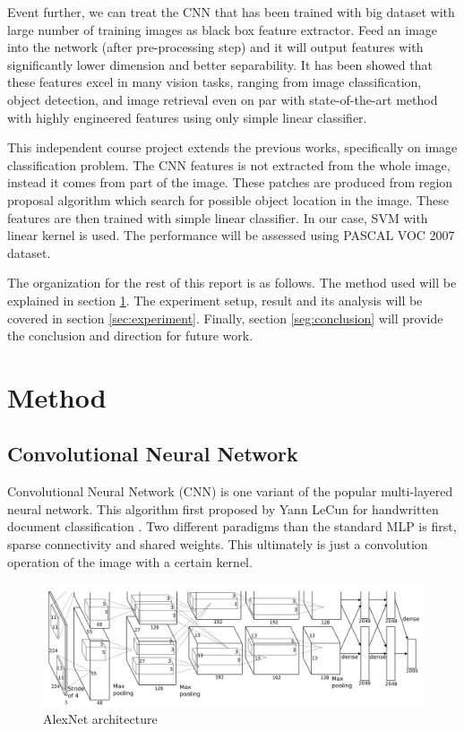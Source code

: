 \documentclass[a4paper]{article}
\begin{document}
Event further, we can treat the CNN that has been trained with big dataset with large number of training images as black box feature extractor. Feed an image into the network (after pre-processing step) and it will output features with significantly lower dimension and better separability. It has been showed that these features excel in many vision tasks, ranging from image classification, object detection, and image retrieval \cite{alicvpr2014} even on par with state-of-the-art method with highly engineered features using only simple linear classifier.

This independent course project extends the previous works, specifically on image classification problem. The CNN features is not extracted from the whole image, instead it comes from part of the image. These patches are produced from region proposal algorithm which search for possible object location in the image. These features are then trained with simple linear classifier. In our case, SVM with linear kernel is used. The performance will be assessed using PASCAL VOC 2007 dataset.

The organization for the rest of this report is as follows. The method used will be explained in section \ref{sec:method}. The experiment setup, result and its analysis will be covered in section \ref{sec:experiment}. Finally, section \ref{seg:conclusion} will provide the conclusion and direction for future work.

\section{Method}
\label{sec:method}

\subsection{Convolutional Neural Network}
Convolutional Neural Network (CNN) is one variant of the popular multi-layered neural network. This algorithm first proposed by Yann LeCun for handwritten document classification \cite{lecun}. Two different paradigms than the standard MLP is first, sparse connectivity and shared weights. This ultimately is just a convolution operation of the image with a certain kernel.

\begin{figure}[h]
\centering
\includegraphics[scale=0.3]{img/alexnet.png}
\caption{AlexNet architecture}
\end{figure}
\end{document}
